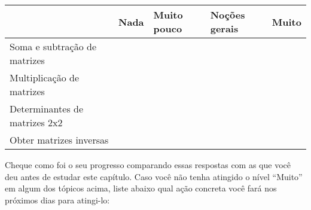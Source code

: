 \documentclass[main.tex]{subfiles}
\begin{document}
\begin{center}
 \begin{tabular}{|p{25mm}||p{10mm}|p{10mm}|p{10mm}|p{10mm}|} 
 \hline
   & Nada & Muito pouco & Noções gerais & Muito\\
 \hline
 Soma e subtração de matrizes &  &  &  &  \\ 
 \hline
 Multiplicação de matrizes &  &  &  &  \\
 \hline
 Determinantes de matrizes 2x2 &  &  &  &  \\
 \hline
 Obter matrizes inversas &  &  &  &  \\
 \hline
\end{tabular}
\end{center}

Cheque como foi o seu progresso comparando essas respostas com as que você deu antes de estudar este capítulo. Caso você não tenha atingido o nível ``Muito''  em algum dos tópicos acima, liste abaixo qual ação concreta você fará nos próximos dias para atingi-lo:

\paraAmbos
\end{document}
